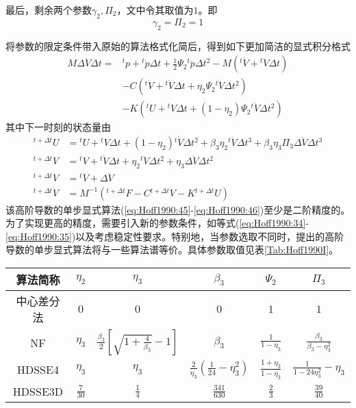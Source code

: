 最后，剩余两个参数$\gamma_2,\Pi_2$，文中令其取值为$1$。即
\begin{equation}
\gamma_2=\Pi_2=1
\end{equation}

将参数的限定条件带入原始的算法格式化简后，得到如下更加简洁的显式积分格式
\begin{equation}
\begin{aligned}
M\Delta\ddot{V}\Delta t=&{^t\!p}+{^t\!\dot{p}}\Delta t+\frac12\Psi_2{^t\!\ddot{p}}\Delta t^2-M({^t\!\dot{V}}+{^t\!\ddot{V}}\Delta t)\\
&-C({^t\!\dot{V}}+{^t\!\dot{V}}\Delta t+\eta_2\Psi_2{^t\!\ddot{V}}\Delta t^2)\\
&-K({^t\!U}+{^t\!V}\Delta t+(1-\eta_2)\Psi_2{^t\!\dot{V}}\Delta t^2)
\end{aligned}\label{eq:Hoff1990:45}
\end{equation}
其中下一时刻的状态量由
\begin{subequations}
\begin{align}
{^{t+\Delta t}\!U}&={^t\!U}+{^t\!{V}}\Delta t+(1-\eta_2){^t\!\dot{V}}\Delta t^2+\beta_3\eta_2{^t\!\ddot{V}}\Delta t^3+\beta_3\eta_3\Pi_3\Delta\ddot{V}\Delta t^3\\
{^{t+\Delta t}\!V}&={^t\!V}+{^{t}\!\dot{V}}\Delta t+\eta_2{^t\!\ddot{V}}\Delta t^2+\eta_3\Delta\ddot{V}\Delta t^2\\
{^{t+\Delta t}\!\ddot{V}}&={^t\!\ddot{V}}+\Delta\ddot{V}\\
{^{t+\Delta t}\!\dot{V}}&=M^{-1}({^{t+\Delta t}\!F}-C{^{t+\Delta t}\!V}-K{^{t+\Delta t}\!U})
\end{align}\label{eq:Hoff1990:46}
\end{subequations}
该高阶导数的单步显式算法(\ref{eq:Hoff1990:45}-\ref{eq:Hoff1990:46})至少是二阶精度的。为了实现更高的精度，需要引入新的参数条件，如等式(\ref{eq:Hoff1990:34}-\ref{eq:Hoff1990:35})以及考虑稳定性要求。特别地，当参数选取不同时，提出的高阶导数的单步显式算法将与一些算法谱等价。具体参数取值见表\ref{Tab:Hoff1990I}。
\vspace{-0.4cm}
\begin{table}[htbp]
\vspace{0.5em}\centering\wuhao
\begin{tabular}{cccccc}
\toprule[1.5pt]
算法简称&$\eta_2$& $\eta_3$ & $\beta_3$ & $\Psi_2$ & $\Pi_3$ \\
\midrule[1pt]
中心差分法 & $0$ & $0$ & $0$ & $1$ & $1$ \\
NF\cite{Kujawski1984a} & $\eta_3$ & $\frac{\beta_3}{2}[\sqrt{1+\frac{4}{\beta_3}}-1]$ & $\beta_3$ & $\frac{1}{1-\eta_3}$ & $\frac{\beta_3}{\beta_3-\eta_3^2}$\\
HDSSE4 & $\eta_3$ & $\eta_3$ & $\frac{2}{\eta_3}(\frac{1}{24}-\eta_3^2)$ & $\frac{1+\eta_3}{1-\eta_3}$ & $\frac{1}{1-24\eta_3^2}-\eta_3$\\
HDSSE3D & $\frac{7}{30}$ & $\frac{1}{4}$ & $\frac{341}{630}$ & $\frac23$ & $\frac{39}{40}$\\
\bottomrule[1.5pt]
\end{tabular}
\end{table}

